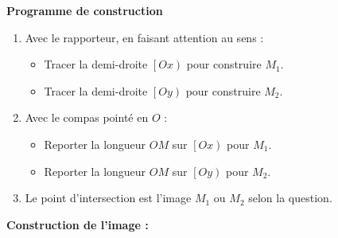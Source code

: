 \begin{methode*1}
\begin{minipage}{0.45\linewidth}
    \end{minipage}
    \begin{minipage}{0.55\linewidth}
        \textbf{Programme de construction}
        \begin{enumerate}
            \item Avec le rapporteur, en faisant attention au sens :
            \begin{itemize}
                \item Tracer la demi-droite $\left[Ox\right)$ pour construire $M_1$.
                \item Tracer la demi-droite $\left[Oy\right)$ pour construire $M_2$.
            \end{itemize}
            \item Avec le compas pointé en $O$ :
            \begin{itemize}
                \item Reporter la longueur $OM$ sur $\left[Ox\right)$ pour $M_1$.
                \item Reporter la longueur $OM$ sur $\left[Oy\right)$ pour $M_2$.
            \end{itemize}
            \item Le point d'intersection est l'image $M_1$ ou $M_2$ selon la question.
        \end{enumerate}
    \end{minipage}
    \begin{myBox}{}
        \textbf{Construction de l'image :}


        \creditInstrumentPoche
    \end{myBox}
\end{methode*1}
